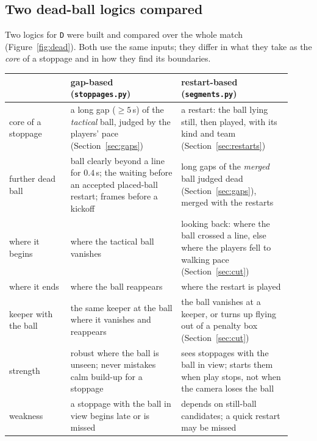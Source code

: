 \documentclass[11pt,a4paper]{article}
\begin{document}
\subsection{Two dead-ball logics compared}\label{sec:compare}

Two logics for \texttt{D} were built and compared over the whole match
(Figure~\ref{fig:dead}). Both use the same inputs; they differ in what they take as the
\emph{core} of a stoppage and in how they find its boundaries.

\begin{center}\small
\begin{tabular}{@{}p{0.2\linewidth}p{0.36\linewidth}p{0.36\linewidth}@{}}
\toprule
 & \textbf{gap-based} (\texttt{stoppages.py}) & \textbf{restart-based} (\texttt{segments.py}) \\ \midrule
core of a stoppage & a long gap ($\ge 5$\,s) of the \emph{tactical} ball, judged by the players' pace
  (Section~\ref{sec:gaps}) & a restart: the ball lying still, then played, with its kind and team
  (Section~\ref{sec:restarts}) \\[0.3em]
further dead ball & ball clearly beyond a line for $0.4$\,s; the waiting before an accepted
  placed-ball restart; frames before a kickoff & long gaps of the \emph{merged} ball judged dead
  (Section~\ref{sec:gaps}), merged with the restarts \\[0.3em]
where it begins & where the tactical ball vanishes & looking back: where the ball crossed a line,
  else where the players fell to walking pace (Section~\ref{sec:cut}) \\[0.3em]
where it ends & where the ball reappears & where the restart is played \\[0.3em]
keeper with the ball & the same keeper at the ball where it vanishes and reappears & the ball
  vanishes at a keeper, or turns up flying out of a penalty box (Section~\ref{sec:cut}) \\[0.3em]
strength & robust where the ball is unseen; never mistakes calm build-up for a stoppage & sees
  stoppages with the ball in view; starts them when play stops, not when the camera loses the ball \\[0.3em]
weakness & a stoppage with the ball in view begins late or is missed & depends on still-ball
  candidates; a quick restart may be missed \\ \bottomrule
\end{tabular}
\end{center}
\end{document}
